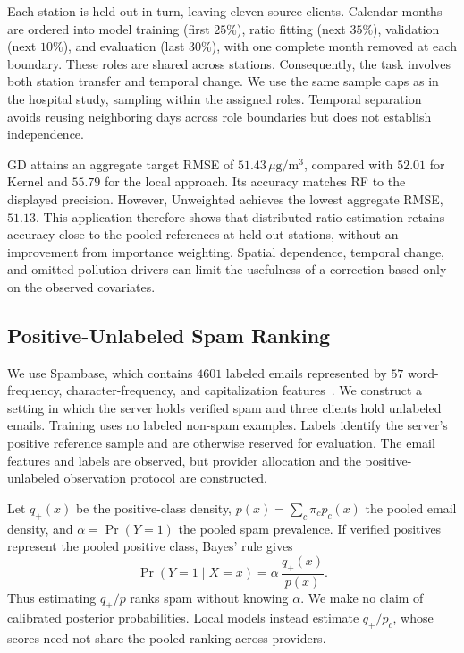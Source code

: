 Each station is held out in turn, leaving eleven source clients. Calendar
months are ordered into model training (first $25\%$), ratio fitting (next
$35\%$), validation (next $10\%$), and evaluation (last $30\%$), with one
complete month removed at each boundary. These roles are shared across
stations. Consequently, the task involves both station transfer and temporal
change. We use the same sample caps as in the hospital study, sampling within
the assigned roles. Temporal separation avoids reusing neighboring days
across role boundaries but does not establish independence.

GD attains an aggregate target RMSE of $51.43\,\mu\mathrm{g}/\mathrm{m}^3$,
compared with $52.01$ for Kernel and $55.79$ for the local approach.
Its accuracy matches RF to the displayed precision.
However, Unweighted achieves the lowest aggregate RMSE, $51.13$.
This application therefore shows that distributed ratio estimation retains
accuracy close to the pooled references at held-out stations, without an
improvement from importance weighting. Spatial
dependence, temporal change, and omitted pollution drivers can limit the
usefulness of a correction based only on the observed covariates.

\subsection{Positive-Unlabeled Spam Ranking}

We use Spambase, which contains $4601$ labeled emails represented by $57$
word-frequency, character-frequency, and capitalization
features~\citep{hopkins1999spambase}. We construct a setting in which the
server holds verified spam and three clients hold unlabeled emails.
Training uses no labeled non-spam examples. Labels identify the server's
positive reference sample and are otherwise reserved for evaluation.
The email features and labels are observed, but provider allocation and
the positive-unlabeled observation protocol are constructed.

Let $q_+(x)$ be the positive-class density, $p(x)=\sum_c\pi_cp_c(x)$ the
pooled email density, and $\alpha=\Pr(Y=1)$ the pooled spam prevalence.
If verified positives represent the pooled positive class, Bayes' rule gives
\[
 \Pr(Y=1\mid X=x)=\alpha\,\frac{q_+(x)}{p(x)}.
\]
Thus estimating $q_+/p$ ranks spam without knowing $\alpha$. We make no
claim of calibrated posterior probabilities. Local models instead estimate
$q_+/p_c$, whose scores need not share the pooled ranking across providers.

